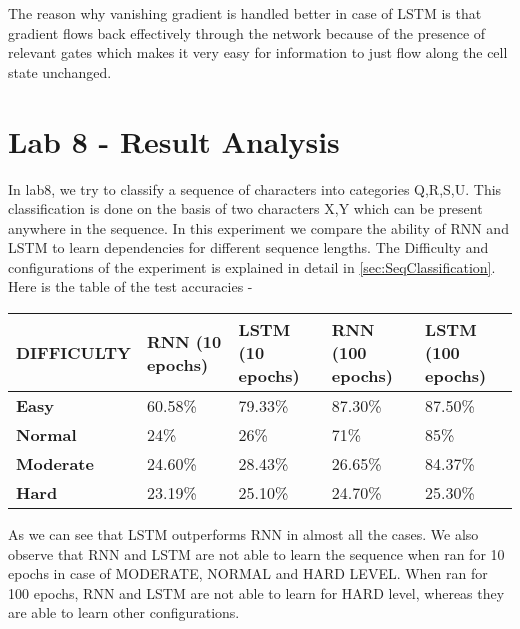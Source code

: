 The reason why vanishing gradient is handled better in case of LSTM is that gradient flows back effectively through the network because of the presence of relevant gates which makes it very easy for information to just flow along the cell state unchanged.


\section{Lab 8 - Result Analysis}
In lab8, we try to classify a sequence of characters into categories Q,R,S,U. 
This classification is done on the basis of two characters X,Y which can be present anywhere in the sequence. 
In this experiment we compare the ability of RNN and LSTM to learn dependencies for different sequence lengths. The Difficulty and configurations of the experiment is explained in detail in \cref{sec:SeqClassification}. Here is the table of the test accuracies - 

\begin{center}
\begin{tabular}{ | p{3cm} | p{2cm} | p{2cm} | p{2cm} | p{2cm} | }
 \hline
   \textbf{DIFFICULTY} & \textbf{RNN (10 epochs)} & \textbf{LSTM (10 epochs)} & \textbf{RNN (100 epochs)} & \textbf{LSTM (100 epochs)} \\ 
 \hline
 \textbf{Easy} & 60.58\% & 79.33\% & 87.30\% & 87.50\% \\
 \hline
\textbf{Normal} & 24\% & 26\% & 71\% & 85\% \\ 
 \hline
 \textbf{Moderate} & 24.60\% & 28.43\% & 26.65\% & 84.37\% \\ 
 \hline
 \textbf{Hard} & 23.19\% & 25.10\% & 24.70\% & 25.30\% \\ 
 \hline
\end{tabular}

\end{center}
As we can see that LSTM outperforms RNN in almost all the cases.
We also observe that RNN and LSTM are not able to learn the sequence when ran for 10 epochs in case of MODERATE, NORMAL and HARD LEVEL.
When ran for 100 epochs, RNN and LSTM are not able to learn for HARD level, whereas they are able to learn other configurations. 
